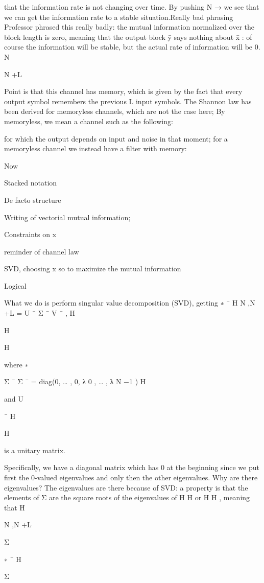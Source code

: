{{{{{that the information rate is not changing over time. By pushing N → \infty we see that we can get the information rate to a stable situation.
​Really bad phrasing Professor phrased this really badly: the mutual information normalized over the block length is zero, meaning that the output block ȳ says nothing about x̄
: of course the information will be stable, but the actual rate of information will be 0.
N

N +L

Point is that this channel has memory, which is given by the fact that every output symbol remembers the previous L input symbols.
The Shannon law has been derived for memoryless channels, which are not the case here;
By memoryless, we mean a channel such as the following:

for which the output depends on input and noise in that moment; for a memoryless channel we instead have a filter with memory:

Now

Stacked notation

De facto structure

Writing of vectorial mutual information;

Constraints on x

reminder of channel law

SVD, choosing x so to maximize the mutual information

Logical

What we do is perform singular value decomposition (SVD), getting
∗
¯
H N ,N +L = U ¯ Σ ¯ V ¯ ,
H

H

H

where
∗

Σ ¯ Σ ¯ = diag(0, … , 0, λ 0 , … , λ N −1 )
H

and U

¯
H

H

is a unitary matrix.

Specifically, we have a diagonal matrix which has 0 at the beginning since we put first the 0-valued eigenvalues and only then the other eigenvalues.
Why are there eigenvalues?
The eigenvalues are there because of SVD: a property is that the elements of Σ are the square roots of the eigenvalues of H̄
H̄
or H̄
H̄
, meaning that H̄

N ,N +L

Σ

∗
¯
H

Σ

}}}}}
